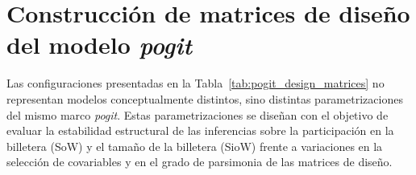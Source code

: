     
\section{Construcción de matrices de diseño del modelo \emph{pogit}}

    Las configuraciones presentadas en la Tabla~\ref{tab:pogit_design_matrices} no representan modelos conceptualmente distintos, sino distintas parametrizaciones del mismo marco \emph{pogit}. Estas parametrizaciones se diseñan con el objetivo de evaluar la estabilidad estructural de las inferencias sobre la participación en la billetera (SoW) y el tamaño de la billetera (SioW) frente a variaciones en la selección de covariables y en el grado de parsimonia de las matrices de diseño.

    \begin{table}[H]
    \centering
    \caption{Configuraciones de matrices de diseño utilizadas en la implementación del modelo \emph{pogit}. Cada versión corresponde a una especificación alternativa de las matrices $\mathbf{W}$ (componente SoW) y $\mathbf{V}$ (componente SioW).}
    \label{tab:pogit_design_matrices}
    \renewcommand{\arraystretch}{1.2}
    \end{table}
    
